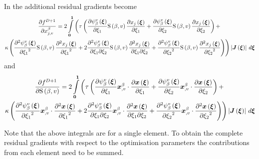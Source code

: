 In \threeds the additional residual gradients become
\begin{multline}
  \delby{f^{D+1}}{x^{\beta}_{j,v}}=2\dintl{\vectr{0}}{\vectr{1}}\left(\tau
    \pbrac{\delby{\gbfn{\beta}{v}{\vectr{\xi}}}{\xione}\gsf{\beta}{
        v}\delby{\fnof{x_{j}}{\vectr{\xi}}}{\xione}+\delby{
        \gbfn{\beta}{v}{\vectr{\xi}}}{\xitwo}\gsf{\beta}{v}
      \delby{\fnof{x_{j}}{\vectr{\xi}}}{\xitwo}}+\right. \\
  \left.\kappa\pbrac{\deltwosqby{\gbfn{\beta}{v}{\vectr{\xi}}}{\xione}
      \gsf{\beta}{v}\deltwosqby{\fnof{x_{j}}{\vectr{\xi}}}{\xione}
      +2\deltwoby{\gbfn{\beta}{v}{\vectr{\xi}}}{\xione}{\xitwo}
      \gsf{\beta}{v}\deltwoby{\fnof{x_{j}}{\vectr{\xi}}}{
        \xione}{\xitwo}+\deltwosqby{\gbfn{\beta}{v}{\vectr{\xi}}}{\xitwo}
      \gsf{\beta}{v}\deltwosqby{\fnof{x_{j}}{\vectr{\xi}}}{\xitwo}}
  \right)\abs{\fnof{\matr{J}}{\vectr{\xi}}}\,d\vectr{\xi}
\end{multline}
and
\begin{multline}
  \delby{f^{D+1}}{\gsf{\beta}{v}}=2\dintl{\vectr{0}}{\vectr{1}}\left(\tau
    \pbrac{\delby{\gbfn{\beta}{v}{\vectr{\xi}}}{\xione}\dotprod{\vectr{x}^{
          \beta}_{,v}}{\delby{\fnof{\vectr{x}}{\vectr{\xi}}}{\xione}}+\delby{\gbfn{
          \beta}{v}{\vectr{\xi}}}{\xitwo}\dotprod{\vectr{x}^{\beta}_{,v}}{
        \delby{\fnof{\vectr{x}}{\vectr{\xi}}}{\xitwo}}}+\right. \\
  \left.\kappa\pbrac{\deltwosqby{\gbfn{\beta}{v}{\vectr{\xi}}}{\xione}
      \dotprod{\vectr{x}^{\beta}_{,v}}{\deltwosqby{\fnof{\vectr{x}}{
            \vectr{\xi}}}{\xione}}+2\deltwoby{\gbfn{\beta}{v}{\vectr{\xi}}}{
        \xione}{\xitwo}\dotprod{\vectr{x}^{\beta}_{,v}}{\deltwoby{
          \fnof{\vectr{x}}{\vectr{\xi}}}{\xione}{\xitwo}}+\deltwosqby{
        \gbfn{\beta}{v}{\vectr{\xi}}}{\xitwo}\dotprod{\vectr{x}^{\beta}_{,v}}{
        \deltwosqby{\fnof{\vectr{x}}{\vectr{\xi}}}{\xitwo}}}\right)\abs{\fnof{\matr{J}}{\vectr{\xi}}}
  \,d\vectr{\xi}
\end{multline}
 
Note that the above integrals are for a single element. To obtain the complete
residual gradients with respect to the optimisation parameters the
contributions from each element need to be summed.

